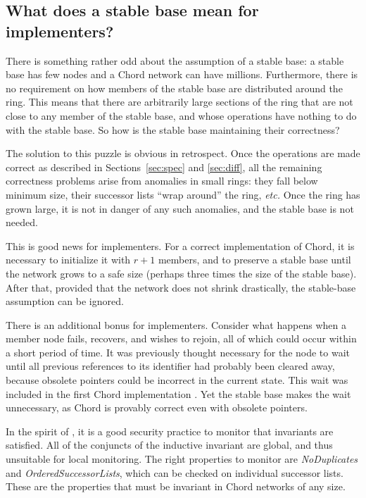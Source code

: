\documentclass[conference]{IEEEtran}
\begin{document}
\subsection{What does a stable base mean for implementers?}

There is something rather odd about the assumption of a stable base:
a stable base has few nodes and a Chord network can have millions.
Furthermore, there is no requirement on how members of the
stable base are distributed around the ring.
This means that there are arbitrarily large sections of the ring that
are not close to any member of the stable base, and whose operations
have nothing to do with the stable base.
So how is the stable base maintaining their correctness?

The solution to this puzzle is obvious in retrospect.
Once the operations are made correct
as described in Sections~\ref{sec:spec}
and \ref{sec:diff}, 
all the remaining correctness problems arise from anomalies in
small rings:
they fall below minimum size, their successor lists ``wrap around''
the ring, {\it etc.}
Once the ring has grown large, it is not in danger of any such
anomalies, and the stable base is not needed.

This is good news for implementers.
For a correct implementation of Chord, it is necessary to initialize
it with $r + 1$ members, and to preserve a stable base until the
network grows to a safe size (perhaps three times the size of the
stable base).
After that, provided that the network does not shrink drastically,
the stable-base assumption can be ignored.

There is an additional bonus for implementers.
Consider what happens when a
member node fails, recovers, and
wishes to rejoin, all of which could occur within a short period of
time.
It was previously thought necessary
for the node to wait until all
previous references to its identifier had probably been 
cleared away, because obsolete pointers could be incorrect in the
current state. 
This wait was included in the first Chord
implementation \cite{excuses}.
Yet the stable base makes the wait unnecessary, as Chord is provably
correct even with obsolete pointers.

In the spirit of \cite{sitmorris}, it is a good security practice
to monitor that invariants are satisfied.
All of the conjuncts of the inductive invariant are global, and thus
unsuitable for local monitoring.
The right properties to monitor are {\it NoDuplicates} and
{\it OrderedSuccessorLists}, which
can be checked on individual successor lists.
These are the properties that must be invariant in Chord networks of
any size.
\end{document}
